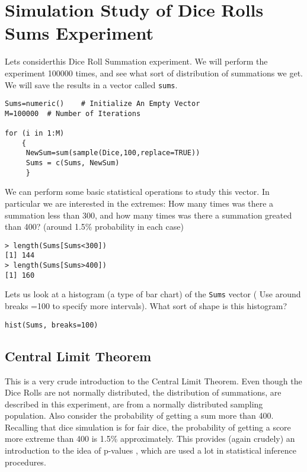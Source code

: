 \documentclass[]{article}
\begin{document}
\section*{Simulation Study of Dice Rolls Sums Experiment}
Lets considerthis Dice Roll Summation experiment. We will perform the experiment 100000 times, and see what sort of distribution of summations we get.
We will save the results in a vector called \texttt{sums}.
\begin{framed}
\begin{verbatim}
Sums=numeric()    # Initialize An Empty Vector
M=100000  # Number of Iterations

for (i in 1:M)
    {
     NewSum=sum(sample(Dice,100,replace=TRUE))
     Sums = c(Sums, NewSum)
     }
\end{verbatim}
\end{framed}

We can perform some basic statistical operations to study this vector. In particular we are interested in the extremes: How many times was there a summation less than 300, and how many times was there a summation greated than 400? (around 1.5\% probability in each case)

\begin{verbatim}
> length(Sums[Sums<300])
[1] 144
> length(Sums[Sums>400])
[1] 160  
\end{verbatim}

Lets us look at a histogram (a type of bar chart) of the \texttt{Sums} vector ( Use around breaks =100 to specify more intervals). What sort of shape is this histogram?
\begin{framed}
\begin{verbatim}
hist(Sums, breaks=100)
\end{verbatim}
\end{framed}

\subsection{Central Limit Theorem}
This is a very crude introduction to the Central Limit Theorem. Even though the Dice Rolls are not normally distributed, the distribution of summations, are described in this experiment, are from a normally distributed sampling population. Also consider the probability of getting a sum more than 400. Recalling that dice simulation is for fair dice, the probability of getting a score more extreme than 400 is 1.5\% approximately. This provides (again crudely) an introduction to the idea of p-values , which are used a lot in statistical inference procedures. 
\end{document}
